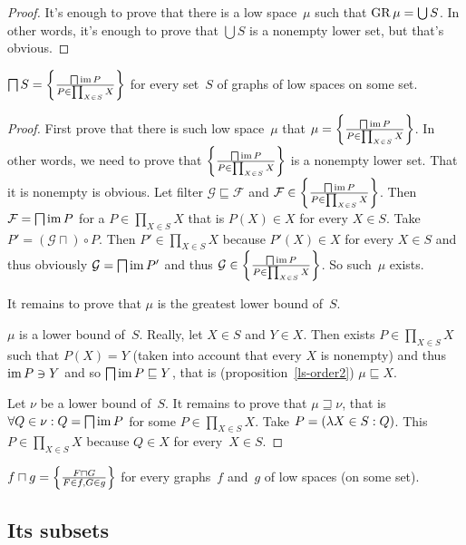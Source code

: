 \begin{proof}
It's enough to prove that there is a low space~$\mu$ such that $\operatorname{GR}\mu=\bigcup S$. In other words, it's enough to prove
that $\bigcup S$ is a nonempty lower set, but that's obvious. 
\end{proof}

\begin{prop}
$\bigsqcap S=\left\{ \frac{\bigsqcap\operatorname{im} P}{P\in\prod_{X\in S} X}\right\}$ for every set~$S$ of graphs of low spaces on some set.
\end{prop}

\begin{proof}
First prove that there is such low space~$\mu$ that $\mu=\left\{ \frac{\bigsqcap\operatorname{im} P}{P\in\prod_{X\in S} X}\right\}$. In other words,
we need to prove that $\left\{ \frac{\bigsqcap\operatorname{im} P}{P\in\prod_{X\in S} X}\right\}$ is a nonempty lower set. That it is nonempty is obvious.
Let filter $\mathcal{G}\sqsubseteq\mathcal{F}$ and $\mathcal{F}\in\left\{ \frac{\bigsqcap\operatorname{im} P}{P\in\prod_{X\in S} X}\right\}$. Then
$\mathcal{F}=\bigsqcap\operatorname{im} P$ for a $P\in\prod_{X\in S} X$ that is $P(X)\in X$ for every $X\in S$. Take $P'=(\mathcal{G}\sqcap)\circ P$.
Then $P'\in\prod_{X\in S} X$ because $P'(X)\in X$ for every $X\in S$ and thus
obviously $\mathcal{G}=\bigsqcap\operatorname{im} P'$ and thus $\mathcal{G}\in\left\{ \frac{\bigsqcap\operatorname{im} P}{P\in\prod_{X\in S} X}\right\}$. So such~$\mu$ exists.

It remains to prove that $\mu$ is the greatest lower bound of~$S$.

$\mu$ is a lower bound of~$S$. Really, let $X\in S$ and $Y\in X$.
Then exists $P\in\prod_{X\in S} X$ such that $P(X)=Y$ (taken into account that every $ X$ is nonempty)
and thus $\operatorname{im} P\ni Y$ and so $\bigsqcap\operatorname{im} P\sqsubseteq Y$, that is (proposition~\ref{ls-order2}) $\mu\sqsubseteq X$.

Let $\nu$ be a lower bound of~$S$. It remains to prove that $\mu\sqsupseteq\nu$, that is
$\forall Q\in\nu: Q=\bigsqcap\operatorname{im} P$ for some $P\in\prod_{X\in S} X$.
Take $P=(\lambda X\in S:Q)$. This $P\in\prod_{X\in S} X$ because $Q\in X$ for every~$X\in S$.
\end{proof}

\begin{cor}
$f\sqcap g = \left\{ \frac{F\sqcap G}{F\in f,G\in g}\right\}$ for every graphs~$f$ and~$g$ of low spaces (on some set).
\end{cor}

\subsection{Its subsets}


